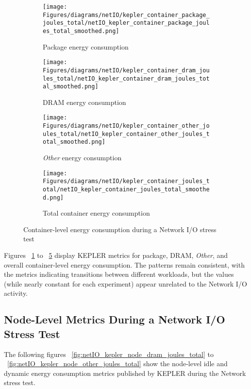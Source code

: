 \begin{figure}[H]
    \centering
    \begin{subfigure}{0.49\textwidth}
        \texttt{[image: Figures/diagrams/netIO/kepler\_container\_package\_joules\_total/netIO\_kepler\_container\_package\_joules\_total\_smoothed.png]}
        \caption{Package energy consumption}
        \label{fig:netIO_kepler_container_package_joules_total}
    \end{subfigure}
    \begin{subfigure}{0.49\textwidth}
        \texttt{[image: Figures/diagrams/netIO/kepler\_container\_dram\_joules\_total/netIO\_kepler\_container\_dram\_joules\_total\_smoothed.png]}
        \caption{DRAM energy consumption}
        \label{fig:netIO_kepler_container_dram_joules_total}
    \end{subfigure}
    \begin{subfigure}{0.49\textwidth}
        \texttt{[image: Figures/diagrams/netIO/kepler\_container\_other\_joules\_total/netIO\_kepler\_container\_other\_joules\_total\_smoothed.png]}
        \caption{\textit{Other} energy consumption}
        \label{fig:netIO_kepler_container_other_joules_total}
    \end{subfigure}
    \begin{subfigure}{0.49\textwidth}
        \texttt{[image: Figures/diagrams/netIO/kepler\_container\_joules\_total/netIO\_kepler\_container\_joules\_total\_smoothed.png]}
        \caption{Total container energy consumption}
        \label{fig:netIO_kepler_container_joules_total}
    \end{subfigure}
    \caption{Container-level energy consumption during a Network I/O stress test}
\end{figure}

Figures ~\ref{fig:netIO_kepler_container_package_joules_total} to ~\ref{fig:netIO_kepler_container_joules_total} display KEPLER metrics for package, DRAM, \textit{Other}, and overall container-level energy consumption. The patterns remain consistent, with the metrics indicating transitions between different workloads, but the values (while nearly constant for each experiment) appear unrelated to the Network I/O activity.

\subsection{Node-Level Metrics During a Network I/O Stress Test}

The following figures ~\ref{fig:netIO_kepler_node_dram_joules_total} to ~\ref{fig:netIO_kepler_node_other_joules_total} show the node-level idle and dynamic energy consumption metrics published by KEPLER during the Network stress test.

